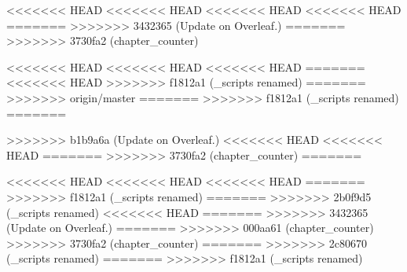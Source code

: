 

% 
% 
\setcounter{chapter}{1}
<<<<<<< HEAD
<<<<<<< HEAD
<<<<<<< HEAD
<<<<<<< HEAD
=======
>>>>>>> 3432365 (Update on Overleaf.)
=======
>>>>>>> 3730fa2 (chapter_counter)

<<<<<<< HEAD
<<<<<<< HEAD
<<<<<<< HEAD
% 
% 
=======
<<<<<<< HEAD
>>>>>>> f1812a1 (_scripts renamed)
=======
>>>>>>> origin/master
=======
>>>>>>> f1812a1 (_scripts renamed)
% 
% 
=======


>>>>>>> b1b9a6a (Update on Overleaf.)
<<<<<<< HEAD
<<<<<<< HEAD
=======
>>>>>>> 3730fa2 (chapter_counter)
=======

% 
% 
<<<<<<< HEAD
<<<<<<< HEAD
<<<<<<< HEAD
=======
>>>>>>> f1812a1 (_scripts renamed)
=======
% 
% 
% 
>>>>>>> 2b0f9d5 (_scripts renamed)
<<<<<<< HEAD
=======
>>>>>>> 3432365 (Update on Overleaf.)
=======
>>>>>>> 000aa61 (chapter_counter)
>>>>>>> 3730fa2 (chapter_counter)
=======
>>>>>>> 2c80670 (_scripts renamed)
=======
>>>>>>> f1812a1 (_scripts renamed)
% 
% 

